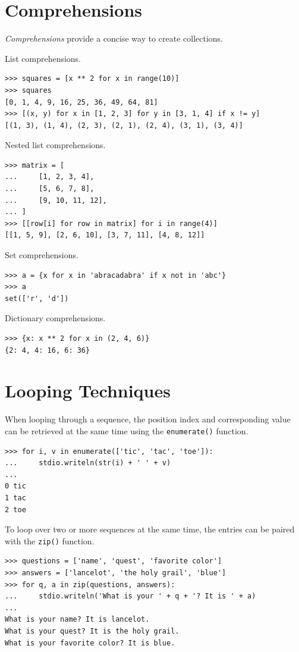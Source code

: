 \documentclass[8pt,a4paper,compress,handout]{beamer}
\begin{document}
\section{Comprehensions}
\begin{frame}[fragile]
\emph{Comprehensions} provide a concise way to create collections.

\bigskip

List comprehensions.
\begin{lstlisting}[language={}]
>>> squares = [x ** 2 for x in range(10)]
>>> squares
[0, 1, 4, 9, 16, 25, 36, 49, 64, 81]
>>> [(x, y) for x in [1, 2, 3] for y in [3, 1, 4] if x != y]
[(1, 3), (1, 4), (2, 3), (2, 1), (2, 4), (3, 1), (3, 4)]
\end{lstlisting}

\bigskip

Nested list comprehensions.
\begin{lstlisting}[language={}]
>>> matrix = [
...     [1, 2, 3, 4],
...     [5, 6, 7, 8],
...     [9, 10, 11, 12],
... ]
>>> [[row[i] for row in matrix] for i in range(4)]
[[1, 5, 9], [2, 6, 10], [3, 7, 11], [4, 8, 12]]
\end{lstlisting}

\bigskip

Set comprehensions.
\begin{lstlisting}[language={}]
>>> a = {x for x in 'abracadabra' if x not in 'abc'}
>>> a
set(['r', 'd'])
\end{lstlisting}

\bigskip

Dictionary comprehensions.
\begin{lstlisting}[language={}]
>>> {x: x ** 2 for x in (2, 4, 6)}
{2: 4, 4: 16, 6: 36}
\end{lstlisting}
\end{frame}

\section{Looping Techniques}
\begin{frame}[fragile]
When looping through a sequence, the position index and corresponding value can be retrieved at the same time using the \lstinline{enumerate()} function.
\begin{lstlisting}[language={}]
>>> for i, v in enumerate(['tic', 'tac', 'toe']):
...     stdio.writeln(str(i) + ' ' + v)
...
0 tic
1 tac
2 toe
\end{lstlisting}

\bigskip

To loop over two or more sequences at the same time, the entries can be paired with the \lstinline{zip()} function.
\begin{lstlisting}[language={}]
>>> questions = ['name', 'quest', 'favorite color']
>>> answers = ['lancelot', 'the holy grail', 'blue']
>>> for q, a in zip(questions, answers):
...     stdio.writeln('What is your ' + q + '? It is ' + a)
...
What is your name? It is lancelot.
What is your quest? It is the holy grail.
What is your favorite color? It is blue.
\end{lstlisting}
\end{frame}
\end{document}
